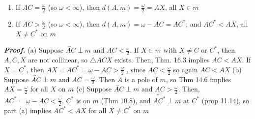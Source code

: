 \documentclass{report}
\begin{document}
\begin{itemize}
\begin{enumerate}[label=(\alph*)]
                \item If $AC = \frac{\omega}{2}$ (so $\omega<\infty$), then $d(A,m) = \frac{\omega}{2} = AX$, all $X \in m$
                \item If $AC > \frac{\omega}{2}$ (so $\omega<\infty$), then $d(A,m)  = \omega - AC = AC^{*}$; and $AC^{*} < AX$, all $X \ne C^{*}$ on $m$
            \end{enumerate}
            \bigbreak \noindent 
            \textbf{\textit{Proof.}} 
            \bigbreak \noindent 
            (a) Suppose $\overleftrightarrow{AC} \perp m$ and $AC < \frac{\omega}{2}$. If $ X \in m$ with $X \ne C$ or $C^{*}$, then $A,C,X$ are not collinear, so $\triangle ACX$ exists. Then, Thm. 16.3 implies $AC < AX$. If $X = C^{*}$, then $AX = AC^{*} = \omega - AC > \frac{\omega}{2} $ , since $AC < \frac{\omega}{2} $ so again $AC < AX$
            \bigbreak \noindent 
            (b) Suppose $\overleftrightarrow{AC} \perp m$ and $ AC = \frac{\omega}{2} $. Then $A$ is a pole of $m$, so Thm 14.6 implies $AX = \frac{\omega}{2}$ for all $X$ on $m$
            \bigbreak \noindent 
            (c) Suppose $\overleftrightarrow{AC} \perp m$ and $AC > \frac{\omega}{2}$. Then, $AC^{*} = \omega - AC < \frac{\omega}{2}$. $C^{*}$ is on $m$ (Thm 10.8), and $\overleftrightarrow{AC^{*}} \perp m$ at $C^{*}$ (prop 11.14), so part (a) implies $AC^{*} < AX$ for all $X \ne C^{*}$ on $m$
    \end{itemize}

    \pagebreak 
\end{document}

